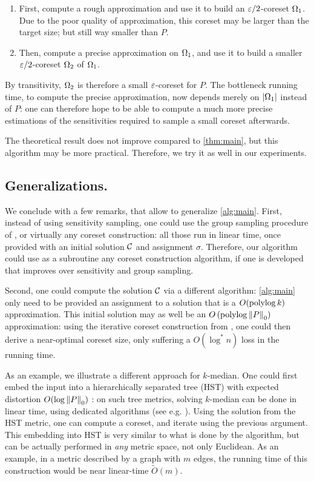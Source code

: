 \begin{enumerate}
\item First, compute a rough approximation and use it to build an $\varepsilon/2$-coreset $\Omega_1$. Due to the poor quality of approximation, this coreset may be larger than the target size; but still way smaller than $P$.
\item  Then, compute a precise approximation on $\Omega_1$, and use it to build a smaller $\varepsilon/2$-coreset $\Omega_2$ of $\Omega_1$. 
\end{enumerate}
By transitivity, $\Omega_2$ is therefore a small $\varepsilon$-coreset for $P$. The bottleneck running time, to compute the precise approximation, now depends merely on $|\Omega_1|$ instead of $P$: one can therefore hope to be able to compute a much more precise estimations of the sensitivities required to sample a small coreset afterwards.

The theoretical result does not improve compared to \cref{thm:main}, but this algorithm may be more practical. Therefore, we try it as well in our experiments.


\subsection{Generalizations.} 
We conclude with a few remarks, that allow to generalize \cref{alg:main}.
First, instead of using sensitivity sampling, one could use the group sampling procedure of \cite{stoc21}, or virtually any coreset construction: all those run in linear time, once provided with an initial solution $\mathcal C$ and assignment $\sigma$. 
Therefore, our algorithm could use as a subroutine any coreset construction algorithm, if one is developed that improves over sensitivity and group sampling.

Second, one could compute the solution $\mathcal C$ via a different algorithm: \cref{alg:main} only need to be provided an assignment to a solution that is a $O(\operatorname{polylog} k)$ approximation. 
This initial solution may as well be an $O\left(\operatorname{polylog} \left\| P \right\|_0 \right)$ approximation: using the iterative coreset construction from \cite{BravermanJKW21}, one could then derive a near-optimal coreset size, only suffering a $O(\log^* n)$ loss in the running time.

As an example, we illustrate a different approach for $k$-median. One could first embed the input into a hierarchically separated tree (HST) with expected distortion $O(\log \left\| P \right\|_0)$ \cite{FakcharoenpholRT03}: on such tree metrics, solving $k$-median can be done in linear time, using dedicated algorithms (see e.g. \cite{Cohen-AddadLNSS21}). Using the solution from the HST metric, one can compute a coreset, and iterate using the previous argument.
This embedding into HST is very similar to what is done by the \fkmeans algorithm, but can be actually performed in \emph{any} metric space, not only Euclidean. 
As an example, in a metric described by a graph with $m$ edges, the running time of this construction would be near linear-time $\tilde O(m)$.
